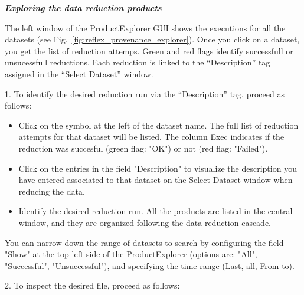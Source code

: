 \bigskip

{\bf {\it Exploring the data reduction products}}


The left window of the ProductExplorer GUI shows the executions for
all the datasets (see Fig.~\ref{fig:reflex_provenance_explorer}). Once
you click on a dataset, you get the list of reduction attemps. Green
and red flags identify successfull or unsucessfull reductions. Each
reduction is linked to the ``Description'' tag assigned in the
``Select Dataset'' window.

\medskip

1. To identify the desired reduction run via the ``Description'' tag, proceed as follows:

\begin{itemize}
 \item Click on the symbol at the left of the dataset name. The full list
   of reduction attempts for that dataset will be listed. The column
   Exec indicates if the reduction was succesful (green flag: "OK") or
   not (red flag: "Failed").  

 \item Click on the entries in the field "Description" to visualize
   the description you have entered associated to that dataset on the
   Select Dataset window when reducing the data.

 \item  Identify the desired reduction run. All the products are listed in
   the central window, and they are organized following the data
   reduction cascade.
\end{itemize}

You can narrow down the range of datasets to search by configuring the
field "Show" at the top-left side of the ProductExplorer (options are:
"All", "Successful", "Unsuccessful"), and specifying the time range
(Last, all, From-to).

\medskip

2. To inspect the desired file, proceed as follows:

